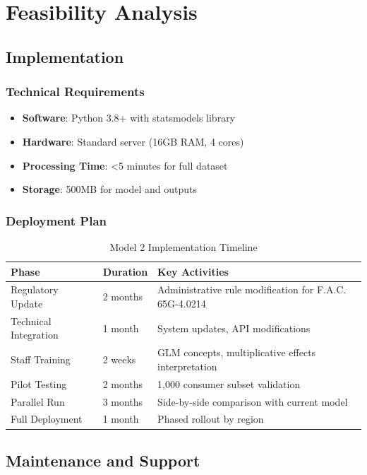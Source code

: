 \section{Feasibility Analysis}

\subsection{Implementation}

\subsubsection{Technical Requirements}
\begin{itemize}
    \item \textbf{Software}: Python 3.8+ with statsmodels library
    \item \textbf{Hardware}: Standard server (16GB RAM, 4 cores)
    \item \textbf{Processing Time}: <5 minutes for full dataset
    \item \textbf{Storage}: 500MB for model and outputs
\end{itemize}

\subsubsection{Deployment Plan}

\begin{table}[h]
\centering
\caption{Model 2 Implementation Timeline}
\begin{tabular}{llp{8cm}}
\toprule
\textbf{Phase} & \textbf{Duration} & \textbf{Key Activities} \\
\midrule
Regulatory Update & 2 months & Administrative rule modification for F.A.C. 65G-4.0214 \\
Technical Integration & 1 month & System updates, API modifications \\
Staff Training & 2 weeks & GLM concepts, multiplicative effects interpretation \\
Pilot Testing & 2 months & 1,000 consumer subset validation \\
Parallel Run & 3 months & Side-by-side comparison with current model \\
Full Deployment & 1 month & Phased rollout by region \\
\bottomrule
\end{tabular}
\end{table}

\subsection{Maintenance and Support}

